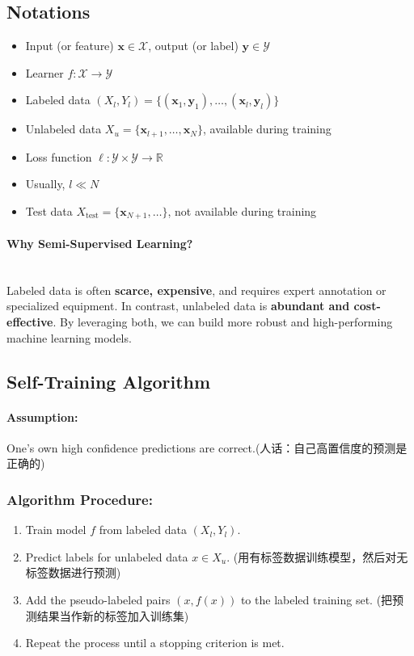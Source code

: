 \documentclass[UTF8]{ctexart}
\begin{document}
\subsection{Notations}

\begin{itemize}
    \item Input (or feature) $\mathbf{x} \in \mathcal{X}$, output (or label) $\mathbf{y} \in \mathcal{Y}$
    \item Learner $f : \mathcal{X} \to \mathcal{Y}$
    \item Labeled data $(X_l, Y_l) = \{(\mathbf{x}_1, \mathbf{y}_1), \dots, (\mathbf{x}_l, \mathbf{y}_l)\}$
    \item Unlabeled data $X_u = \{\mathbf{x}_{l+1}, \dots, \mathbf{x}_N\}$, available during training
    \item Loss function $\ell : \mathcal{Y} \times \mathcal{Y} \to \mathbb{R}$
    \item Usually, $l \ll N$
    \item Test data $X_{\text{test}} = \{ \mathbf{x}_{N+1}, \dots \}$, not available during training
\end{itemize}
\paragraph{Why Semi-Supervised Learning?} ~\\
Labeled data is often \textbf{scarce, expensive}, and requires expert annotation or specialized equipment. 
In contrast, unlabeled data is \textbf{abundant and cost-effective}. 
By leveraging both, we can build more robust and high-performing machine learning models.

\subsection{Self-Training Algorithm}
\paragraph{Assumption:} One's own high confidence predictions are correct.(人话：自己高置信度的预测是正确的)

\subsubsection{Algorithm Procedure:}
\begin{enumerate}
    \item Train model $f$ from labeled data $(X_l, Y_l)$.
    \item Predict labels for unlabeled data $x \in X_u$. (用有标签数据训练模型，然后对无标签数据进行预测)
    \item Add the pseudo-labeled pairs $(x, f(x))$ to the labeled training set. (把预测结果当作新的标签加入训练集)
    \item Repeat the process until a stopping criterion is met.
\end{enumerate}
\end{document}
